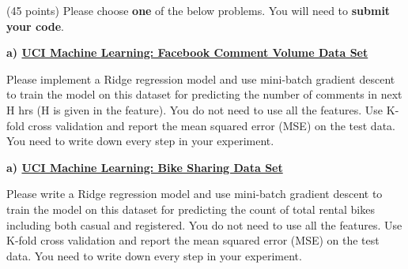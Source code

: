 \documentclass{exam}
\begin{document}
\begin{questions}
\newpage
{} (45 points) Please choose \textbf{one} of the below problems. You will need to \textbf{submit your code}.

{\bf a) \href{https://archive.ics.uci.edu/ml/datasets/Facebook+Comment+Volume+Dataset}{UCI Machine Learning: Facebook Comment Volume Data Set }}

Please implement a Ridge regression model and use mini-batch gradient descent to train the model on this dataset for predicting the number of comments in next H hrs (H is given in the feature).  You do not need to use all the features. Use K-fold cross validation and report the mean squared error (MSE) on the test data. You need to write down every step in your experiment.

{\bf a) \href{https://archive.ics.uci.edu/ml/datasets/Bike+Sharing+Dataset}{UCI Machine Learning: Bike Sharing Data Set}}

Please write a Ridge regression model and use mini-batch gradient descent to train the model on this dataset for predicting the count of total rental bikes including both casual and registered.  You do not need to use all the features. Use K-fold cross validation and report the mean squared error (MSE) on the test data. You need to write down every step in your experiment. 


 
\end{questions}

\vspace{10em}
\end{document}
